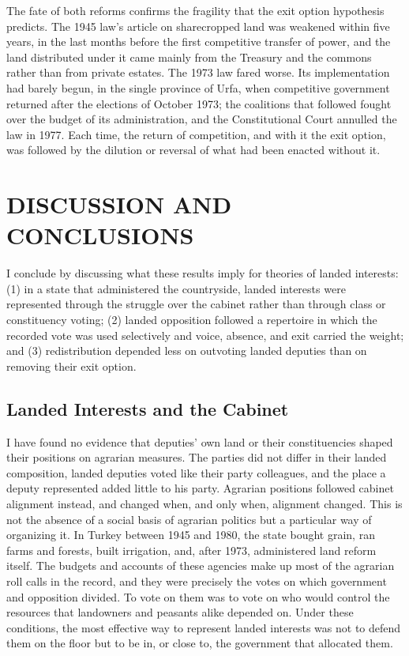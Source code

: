 \documentclass[12pt]{article}
\begin{document}
The fate of both reforms confirms the fragility that the exit option hypothesis predicts. The 1945 law's article on sharecropped land was weakened within five years, in the last months before the first competitive transfer of power, and the land distributed under it came mainly from the Treasury and the commons rather than from private estates. The 1973 law fared worse. Its implementation had barely begun, in the single province of Urfa, when competitive government returned after the elections of October 1973; the coalitions that followed fought over the budget of its administration, and the Constitutional Court annulled the law in 1977. Each time, the return of competition, and with it the exit option, was followed by the dilution or reversal of what had been enacted without it.

\section*{DISCUSSION AND CONCLUSIONS}

I conclude by discussing what these results imply for theories of landed interests: (1) in a state that administered the countryside, landed interests were represented through the struggle over the cabinet rather than through class or constituency voting; (2) landed opposition followed a repertoire in which the recorded vote was used selectively and voice, absence, and exit carried the weight; and (3) redistribution depended less on outvoting landed deputies than on removing their exit option.

\subsection*{Landed Interests and the Cabinet}

I have found no evidence that deputies' own land or their constituencies shaped their positions on agrarian measures. The parties did not differ in their landed composition, landed deputies voted like their party colleagues, and the place a deputy represented added little to his party. Agrarian positions followed cabinet alignment instead, and changed when, and only when, alignment changed. This is not the absence of a social basis of agrarian politics but a particular way of organizing it. In Turkey between 1945 and 1980, the state bought grain, ran farms and forests, built irrigation, and, after 1973, administered land reform itself. The budgets and accounts of these agencies make up most of the agrarian roll calls in the record, and they were precisely the votes on which government and opposition divided. To vote on them was to vote on who would control the resources that landowners and peasants alike depended on. Under these conditions, the most effective way to represent landed interests was not to defend them on the floor but to be in, or close to, the government that allocated them.
\end{document}
